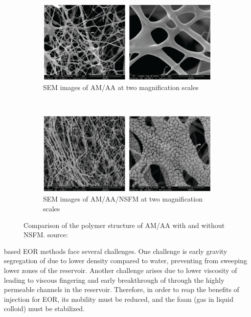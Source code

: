 \begin{figure}
    \begin{subfigure}{\textwidth}
    \centering
    \includegraphics[width=\textwidth]{img/fig/AM-AA.png}
    \caption{SEM images of AM/AA at two magnification scales}
    \label{fig:AM-AA}
    \end{subfigure}
    \\
    \begin{subfigure}{\textwidth}
    \centering
    \includegraphics[width=\textwidth]{img/fig/AM-AA-NP.png}
    \caption{SEM images of AM/AA/NSFM at two magnification scales}
    \label{fig:AM-AA-NP}
    \end{subfigure}
    
    \caption{Comparison of the polymer structure of AM/AA with and without NSFM. source: \citet{Ye2013}}
    \label{fig:AMAANP}
\end{figure}    


 based EOR methods face several challenges. One challenge is early gravity segregation of  due to lower density compared to water, preventing  from sweeping lower zones of the reservoir. Another challenge arises due to lower viscosity of  leading to viscous fingering and early breakthrough of  through the highly permeable channels in the reservoir. Therefore, in order to reap the benefits of  injection for EOR, its mobility must be reduced, and the  foam (gas in liquid colloid) must be stabilized. 

